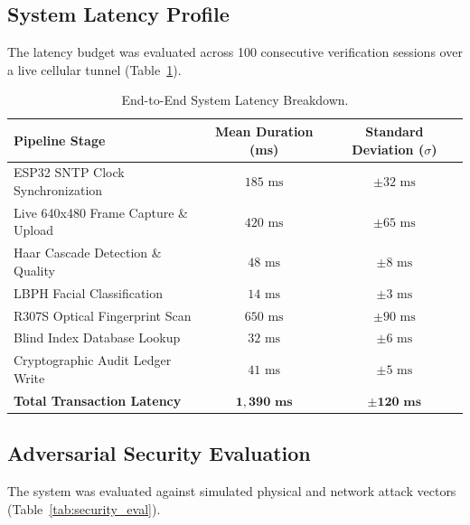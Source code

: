 \documentclass[11pt,a4paper]{article}
\begin{document}
\subsection{System Latency Profile}
The latency budget was evaluated across 100 consecutive verification sessions over a live cellular tunnel (Table~\ref{tab:latency}).

\begin{table}[htbp]
\centering
\caption{End-to-End System Latency Breakdown.}
\label{tab:latency}
\begin{tabularx}{\textwidth}{X c c}
\toprule
\textbf{Pipeline Stage} & \textbf{Mean Duration (ms)} & \textbf{Standard Deviation ($\sigma$)} \\
\midrule
ESP32 SNTP Clock Synchronization     & $185\text{ ms}$ & $\pm 32\text{ ms}$ \\
Live 640x480 Frame Capture \& Upload & $420\text{ ms}$ & $\pm 65\text{ ms}$ \\
Haar Cascade Detection \& Quality    & $48\text{ ms}$  & $\pm 8\text{ ms}$ \\
LBPH Facial Classification           & $14\text{ ms}$  & $\pm 3\text{ ms}$ \\
R307S Optical Fingerprint Scan       & $650\text{ ms}$ & $\pm 90\text{ ms}$ \\
Blind Index Database Lookup          & $32\text{ ms}$  & $\pm 6\text{ ms}$ \\
Cryptographic Audit Ledger Write     & $41\text{ ms}$  & $\pm 5\text{ ms}$ \\
\midrule
\textbf{Total Transaction Latency}   & $\mathbf{1,390\text{ ms}}$ & $\mathbf{\pm 120\text{ ms}}$ \\
\bottomrule
\end{tabularx}
\end{table}

\subsection{Adversarial Security Evaluation}
The system was evaluated against simulated physical and network attack vectors (Table~\ref{tab:security_eval}).
\end{document}
